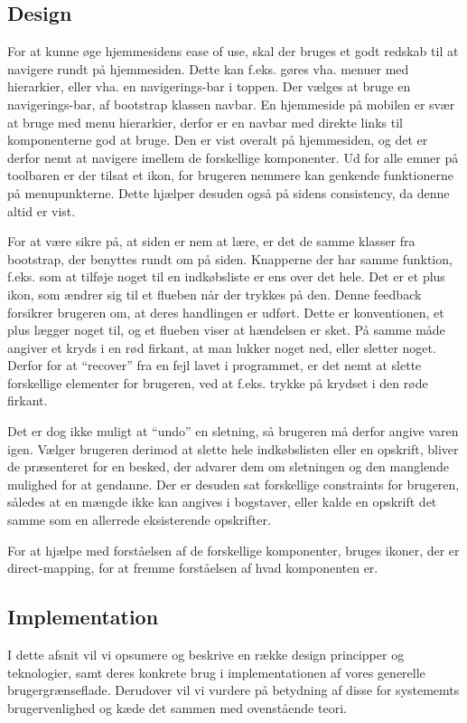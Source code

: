 \subsection{Design}
For at kunne øge hjemmesidens ease of use, skal der bruges et godt redskab til at navigere rundt på hjemmesiden.
Dette kan f.eks. gøres vha. menuer med hierarkier, eller vha. en navigerings-bar i toppen.
Der vælges at bruge en navigerings-bar, af bootstrap klassen navbar. 
En hjemmeside på mobilen er svær at bruge med menu hierarkier, derfor er en navbar med direkte links til komponenterne god at bruge. 
Den er vist overalt på hjemmesiden, og det er derfor nemt at navigere imellem de forskellige komponenter.
Ud for alle emner på toolbaren er der tilsat et ikon, for brugeren nemmere kan genkende funktionerne på menupunkterne.
Dette hjælper desuden også på sidens consistency, da denne altid er vist.

For at være sikre på, at siden er nem at lære, er det de samme klasser fra bootstrap, der benyttes rundt om på siden. 
Knapperne der har samme funktion, f.eks. som at tilføje noget til en indkøbsliste er ens over det hele. 
Det er et plus ikon, som ændrer sig til et flueben når der trykkes på den.
Denne feedback forsikrer brugeren om, at deres handlingen er udført.
Dette er konventionen, et plus lægger noget til, og et flueben viser at hændelsen er sket.
På samme måde angiver et kryds i en rød firkant, at man lukker noget ned, eller sletter noget.
Derfor for at ``recover'' fra en fejl lavet i programmet, er det nemt at slette forskellige elementer for brugeren, ved at f.eks. trykke på krydset i den røde firkant.

Det er dog ikke muligt at ``undo'' en sletning, så brugeren må derfor angive varen igen.
Vælger brugeren derimod at slette hele indkøbslisten eller en opskrift, bliver de præsenteret for en besked, der advarer dem om sletningen og den manglende mulighed for at gendanne.
Der er desuden sat forskellige constraints for brugeren, således at en mængde ikke kan angives i bogstaver, eller kalde en opskrift det samme som en allerrede eksisterende opskrifter.

For at hjælpe med forståelsen af de forskellige komponenter, bruges ikoner, der er direct-mapping, for at fremme forståelsen af hvad komponenten er.
	
\subsection{Implementation}
I dette afsnit vil vi opsumere og beskrive en række design principper og teknologier, samt deres konkrete brug i implementationen af vores generelle brugergrænseflade. Derudover vil vi vurdere på betydning af disse for systememts brugervenlighed og kæde det sammen med ovenstående teori.

